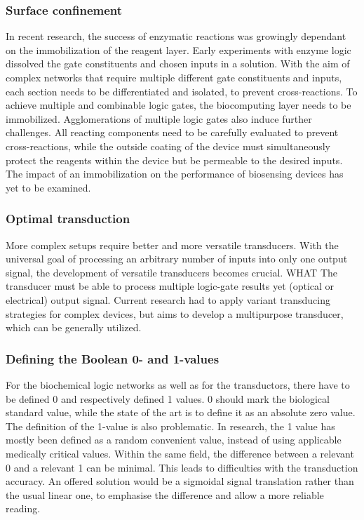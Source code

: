 \documentclass[runningheads]{llncs}
\begin{document}
\subsubsection{Surface confinement}	In recent research, the success of enzymatic reactions was growingly dependant on the immobilization of the reagent layer. Early experiments with enzyme logic dissolved the gate constituents and chosen inputs in a solution. With the aim of complex networks that require multiple different gate constituents and inputs, each section needs to be differentiated and isolated, to prevent cross-reactions. To achieve multiple and combinable logic gates, the biocomputing layer needs to be immobilized. Agglomerations of multiple logic gates also induce further challenges. All reacting components need to be carefully evaluated to prevent cross-reactions, while the outside coating of the device must simultaneously protect the reagents within the device but be permeable to the desired inputs. The impact of an immobilization on the performance of biosensing devices has yet to be examined.

\subsubsection{Optimal transduction} More complex setups require better and more versatile transducers. With the universal goal of processing an arbitrary number of inputs into only one output signal, the development of versatile transducers becomes crucial. WHAT The transducer must be able to process multiple logic-gate results yet (optical or electrical) output signal. Current research had to apply variant transducing strategies for complex devices, but aims to develop a multipurpose transducer, which can be generally utilized.

\subsubsection{Defining the Boolean 0- and 1-values} For the biochemical logic networks as well as for the transductors, there have to be defined 0 and respectively defined 1 values. 0 should mark the biological standard value, while the state of the art is to define it as an absolute zero value. The definition of the 1-value is also problematic. In research, the 1 value has mostly been defined as a random convenient value, instead of using applicable medically critical values. Within the same field, the difference between a relevant 0 and a relevant 1 can be minimal. This leads to difficulties with the transduction accuracy. An offered solution would be a sigmoidal signal translation rather than the usual linear one, to emphasise the difference and allow a more reliable reading.
\end{document}
